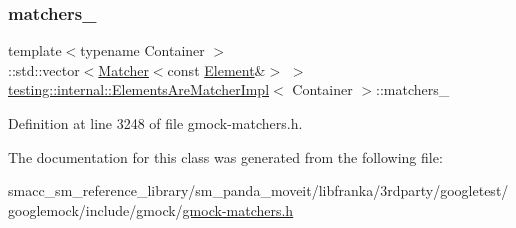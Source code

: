\subsubsection{\texorpdfstring{matchers\+\_\+}{matchers\_}}
{\footnotesize\ttfamily template$<$typename Container $>$ \\
\+::std\+::vector$<$\hyperlink{classtesting_1_1Matcher}{Matcher}$<$const \hyperlink{classtesting_1_1internal_1_1ElementsAreMatcherImpl_ab2ae88256ac950b69cd2af67b9820c87}{Element}\&$>$ $>$ \hyperlink{classtesting_1_1internal_1_1ElementsAreMatcherImpl}{testing\+::internal\+::\+Elements\+Are\+Matcher\+Impl}$<$ Container $>$\+::matchers\+\_\+\hspace{0.3cm}{\ttfamily [private]}}



Definition at line 3248 of file gmock-\/matchers.\+h.



The documentation for this class was generated from the following file\+:\begin{DoxyCompactItemize}
\item 
smacc\+\_\+sm\+\_\+reference\+\_\+library/sm\+\_\+panda\+\_\+moveit/libfranka/3rdparty/googletest/googlemock/include/gmock/\hyperlink{gmock-matchers_8h}{gmock-\/matchers.\+h}\end{DoxyCompactItemize}
